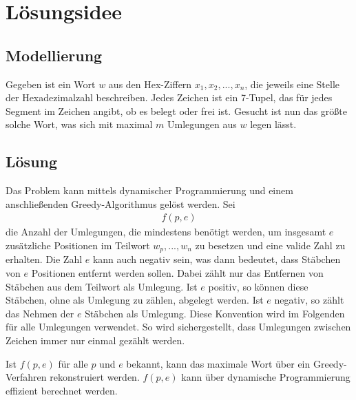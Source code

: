 \documentclass[a4paper,10pt,ngerman]{scrartcl}
\begin{document}
\maketitle
\tableofcontents

\section{Lösungsidee}
\subsection{Modellierung}
Gegeben ist ein Wort $w$ aus den Hex-Ziffern $x_1, x_2, ..., x_n$, die jeweils eine Stelle der Hexadezimalzahl beschreiben.
Jedes Zeichen ist ein 7-Tupel, das für jedes Segment im Zeichen angibt, ob es belegt oder frei ist.
Gesucht ist nun das größte solche Wort, was sich mit maximal $m$ Umlegungen aus $w$ legen lässt.

\subsection{Lösung}
Das Problem kann mittels dynamischer Programmierung und einem anschließenden Greedy-Algorithmus gelöst werden. 
Sei 
\begin{align}
    f(p, e)
\end{align}
die Anzahl der Umlegungen, die mindestens benötigt werden, um insgesamt $e$ zusätzliche Positionen im Teilwort $w_p, ..., w_n$ zu besetzen und eine valide Zahl zu erhalten. Die Zahl $e$ kann auch negativ sein, was dann bedeutet, dass Stäbchen von $e$ Positionen entfernt werden sollen. Dabei zählt nur das Entfernen von Stäbchen aus dem Teilwort als Umlegung. Ist $e$ positiv, so können diese Stäbchen, ohne als Umlegung zu zählen, abgelegt werden. Ist $e$ negativ, so zählt das Nehmen der $e$ Stäbchen als Umlegung. Diese Konvention wird im Folgenden für alle Umlegungen verwendet. So wird sichergestellt, dass Umlegungen zwischen Zeichen immer nur einmal gezählt werden.

Ist $f(p, e)$ für alle $p$ und $e$ bekannt, kann das maximale Wort über ein Greedy-Verfahren rekonstruiert werden. 
$f(p, e)$ kann über dynamische Programmierung effizient berechnet werden. 
\end{document}
